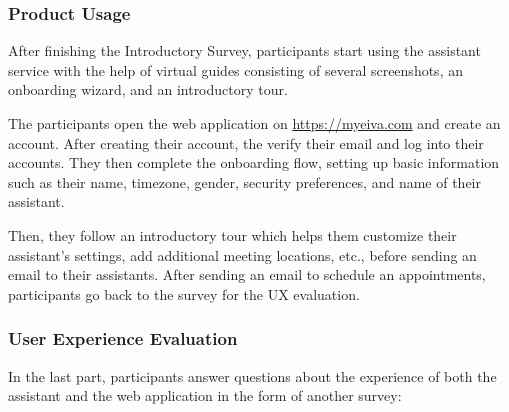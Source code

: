 \documentclass{article}
\begin{document}
\subsubsection{Product Usage}

After finishing the Introductory Survey, participants start using the assistant service with the help of virtual guides consisting of several screenshots, an onboarding wizard, and an introductory tour.

The participants open the web application on \url{https://myeiva.com} and create an account. After creating their account, the verify their email and log into their accounts. They then complete the onboarding flow, setting up basic information such as their name, timezone, gender, security preferences, and name of their assistant.

Then, they follow an introductory tour which helps them customize their assistant's settings, add additional meeting locations, etc., before sending an email to their assistants. After sending an email to schedule an appointments, participants go back to the survey for the UX evaluation.

\subsubsection{User Experience Evaluation}

In the last part, participants answer questions about the experience of both the assistant and the web application in the form of another survey:
\end{document}
